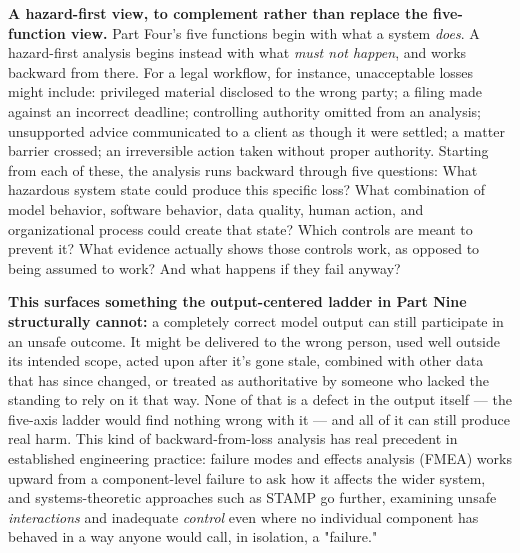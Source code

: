 \textbf{A hazard-first view, to complement rather than replace the five-function view.} Part Four's five functions begin with what a system \emph{does}. A hazard-first analysis begins instead with what \emph{must not happen}, and works backward from there. For a legal workflow, for instance, unacceptable losses might include: privileged material disclosed to the wrong party; a filing made against an incorrect deadline; controlling authority omitted from an analysis; unsupported advice communicated to a client as though it were settled; a matter barrier crossed; an irreversible action taken without proper authority. Starting from each of these, the analysis runs backward through five questions: What hazardous system state could produce this specific loss? What combination of model behavior, software behavior, data quality, human action, and organizational process could create that state? Which controls are meant to prevent it? What evidence actually shows those controls work, as opposed to being assumed to work? And what happens if they fail anyway?

\textbf{This surfaces something the output-centered ladder in Part Nine structurally cannot:} a completely correct model output can still participate in an unsafe outcome. It might be delivered to the wrong person, used well outside its intended scope, acted upon after it's gone stale, combined with other data that has since changed, or treated as authoritative by someone who lacked the standing to rely on it that way. None of that is a defect in the output itself --- the five-axis ladder would find nothing wrong with it --- and all of it can still produce real harm. This kind of backward-from-loss analysis has real precedent in established engineering practice: failure modes and effects analysis (FMEA) works upward from a component-level failure to ask how it affects the wider system, and systems-theoretic approaches such as STAMP go further, examining unsafe \emph{interactions} and inadequate \emph{control} even where no individual component has behaved in a way anyone would call, in isolation, a "failure."
